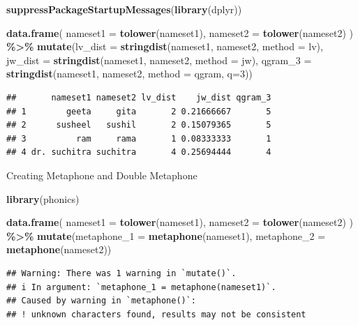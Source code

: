 \documentclass[
]{book}
\newenvironment{Shaded}{\begin{snugshade}}{\end{snugshade}}
\newcommand{\AttributeTok}[1]{\textcolor[rgb]{0.13,0.29,0.53}{#1}}
\newcommand{\DecValTok}[1]{\textcolor[rgb]{0.00,0.00,0.81}{#1}}
\newcommand{\FunctionTok}[1]{\textcolor[rgb]{0.13,0.29,0.53}{\textbf{#1}}}
\newcommand{\NormalTok}[1]{#1}
\newcommand{\SpecialCharTok}[1]{\textcolor[rgb]{0.81,0.36,0.00}{\textbf{#1}}}
\newcommand{\StringTok}[1]{\textcolor[rgb]{0.31,0.60,0.02}{#1}}
\begin{document}
\begin{Shaded}
\begin{Highlighting}[]
\FunctionTok{suppressPackageStartupMessages}\NormalTok{(}\FunctionTok{library}\NormalTok{(dplyr))}

\FunctionTok{data.frame}\NormalTok{(}
  \AttributeTok{nameset1 =} \FunctionTok{tolower}\NormalTok{(nameset1),}
  \AttributeTok{nameset2 =} \FunctionTok{tolower}\NormalTok{(nameset2)}
\NormalTok{) }\SpecialCharTok{\%\textgreater{}\%} 
  \FunctionTok{mutate}\NormalTok{(}\AttributeTok{lv\_dist =} \FunctionTok{stringdist}\NormalTok{(nameset1, nameset2, }\AttributeTok{method =} \StringTok{\textquotesingle{}lv\textquotesingle{}}\NormalTok{),}
         \AttributeTok{jw\_dist =} \FunctionTok{stringdist}\NormalTok{(nameset1, nameset2, }\AttributeTok{method =} \StringTok{\textquotesingle{}jw\textquotesingle{}}\NormalTok{),}
         \AttributeTok{qgram\_3 =} \FunctionTok{stringdist}\NormalTok{(nameset1, nameset2, }\AttributeTok{method =} \StringTok{\textquotesingle{}qgram\textquotesingle{}}\NormalTok{, }\AttributeTok{q=}\DecValTok{3}\NormalTok{))}
\end{Highlighting}
\end{Shaded}

\begin{verbatim}
##       nameset1 nameset2 lv_dist    jw_dist qgram_3
## 1        geeta     gita       2 0.21666667       5
## 2      susheel   sushil       2 0.15079365       5
## 3          ram     rama       1 0.08333333       1
## 4 dr. suchitra suchitra       4 0.25694444       4
\end{verbatim}

Creating Metaphone and Double Metaphone

\begin{Shaded}
\begin{Highlighting}[]
\FunctionTok{library}\NormalTok{(phonics)}

\FunctionTok{data.frame}\NormalTok{(}
  \AttributeTok{nameset1 =} \FunctionTok{tolower}\NormalTok{(nameset1),}
  \AttributeTok{nameset2 =} \FunctionTok{tolower}\NormalTok{(nameset2)}
\NormalTok{) }\SpecialCharTok{\%\textgreater{}\%} 
  \FunctionTok{mutate}\NormalTok{(}\AttributeTok{metaphone\_1 =} \FunctionTok{metaphone}\NormalTok{(nameset1),}
         \AttributeTok{metaphone\_2 =} \FunctionTok{metaphone}\NormalTok{(nameset2))}
\end{Highlighting}
\end{Shaded}

\begin{verbatim}
## Warning: There was 1 warning in `mutate()`.
## i In argument: `metaphone_1 = metaphone(nameset1)`.
## Caused by warning in `metaphone()`:
## ! unknown characters found, results may not be consistent
\end{verbatim}
\end{document}
